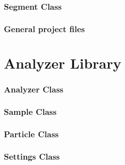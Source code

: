 \documentclass[11pt,fleqn,,a4paper,twoside,openright]{book}
\begin{document}
\subsection{Segment Class}


\newpage
\subsection{General project files}









\chapter{Analyzer Library}
\subsection{Analyzer Class}


\newpage
\subsection{Sample Class}


\newpage
\subsection{Particle Class}


\newpage
\subsection{Settings Class}


\newpage
\end{document}
